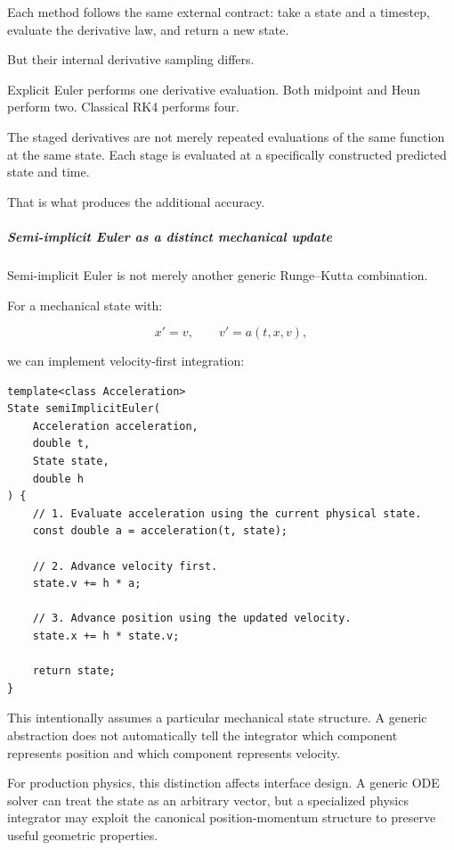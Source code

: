 Each method follows the same external contract: take a state and a timestep, evaluate the derivative law, and return a new state.

But their internal derivative sampling differs.

Explicit Euler performs one derivative evaluation. Both midpoint and Heun perform two. Classical RK4 performs four.

The staged derivatives are not merely repeated evaluations of the same function at the same state. Each stage is evaluated at a specifically constructed predicted state and time.

That is what produces the additional accuracy.

\subparagraph{Semi-implicit Euler as a distinct mechanical update}\label{02-foundations-ii-ch025-semi-implicit-euler-as-a-distinct-mechanical-update}

\hypertarget{02-foundations-ii-ch025-semi-implicit-euler-as-a-distinct-mechanical-update}{}

Semi-implicit Euler is not merely another generic Runge--Kutta combination.

For a mechanical state with:

\[
x'=v,\qquad v'=a(t,x,v),
\]

we can implement velocity-first integration:

\begin{verbatim}
template<class Acceleration>
State semiImplicitEuler(
    Acceleration acceleration,
    double t,
    State state,
    double h
) {
    // 1. Evaluate acceleration using the current physical state.
    const double a = acceleration(t, state);

    // 2. Advance velocity first.
    state.v += h * a;

    // 3. Advance position using the updated velocity.
    state.x += h * state.v;

    return state;
}
\end{verbatim}

This intentionally assumes a particular mechanical state structure. A generic  abstraction does not automatically tell the integrator which component represents position and which component represents velocity.

For production physics, this distinction affects interface design. A generic ODE solver can treat the state as an arbitrary vector, but a specialized physics integrator may exploit the canonical position-momentum structure to preserve useful geometric properties.

